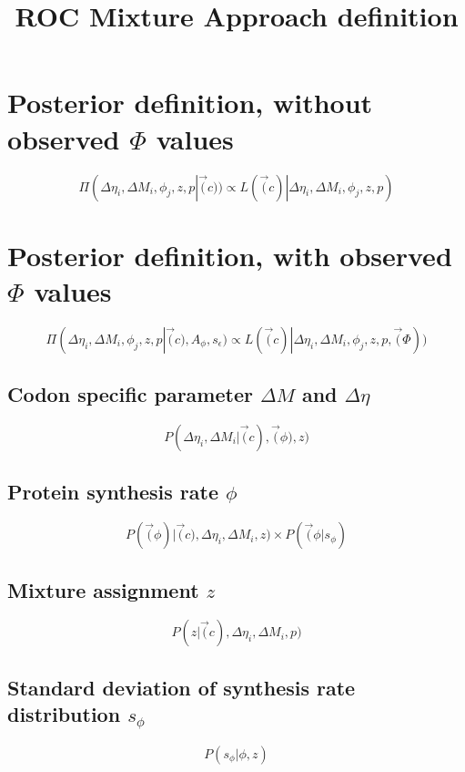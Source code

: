 \documentclass[11pt]{article}
\begin{document}
  \title{ROC Mixture Approach definition}
  \maketitle
  
  \section{Posterior definition, without observed $\Phi$ values}
  \begin{equation}
   \Pi(\Delta \eta_i, \Delta M_i, \phi_j, z, p | \vec(c)) \propto L(\vec(c)|\Delta \eta_i, \Delta M_i, \phi_j, z, p) 
  \end{equation}

  \section{Posterior definition, with observed $\Phi$ values}
  \begin{equation}
   \Pi(\Delta \eta_i, \Delta M_i, \phi_j, z, p | \vec(c), A_{\phi}, s_{\epsilon}) \propto L(\vec(c)|\Delta \eta_i, \Delta M_i, \phi_j, z, p, \vec(\Phi)) 
  \end{equation}

  \subsection{Codon specific parameter $\Delta M$ and $\Delta \eta$}
  \begin{equation}
   P(\Delta \eta_i, \Delta M_i | \vec(c), \vec(\phi), z)
  \end{equation}
  
  \subsection{Protein synthesis rate $\phi$}
  \begin{equation}
   P(\vec(\phi) | \vec(c), \Delta \eta_i, \Delta M_i, z) \times P(\vec(\phi | s_{\phi} )
  \end{equation}
  
  \subsection{Mixture assignment $z$}
  \begin{equation}
   P(z | \vec(c), \Delta \eta_i, \Delta M_i, p )
  \end{equation}
  
  \subsection{Standard deviation of synthesis rate distribution $s_{\phi}$}
  \begin{equation}
   P(s_{\phi} | \phi, z)
  \end{equation}
  
\end{document}
